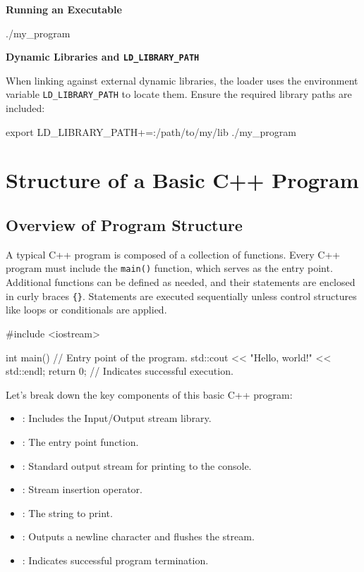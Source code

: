 \textbf{Running an Executable}

\begin{codeblock}[language=bash, numbers=none]
./my_program
\end{codeblock}

\textbf{Dynamic Libraries and \texttt{LD\_LIBRARY\_PATH}}

When linking against external dynamic libraries, the loader uses the environment variable \texttt{LD\_LIBRARY\_PATH} to locate them. Ensure the required library paths are included:

\begin{codeblock}[language=bash, numbers=none]
export LD_LIBRARY_PATH+=:/path/to/my/lib
./my_program
\end{codeblock}

\section{Structure of a Basic C++ Program}

\subsection{Overview of Program Structure}

A typical C++ program is composed of a collection of functions. Every C++ program must include the \texttt{main()} function, which serves as the entry point. Additional functions can be defined as needed, and their statements are enclosed in curly braces \texttt{\{\}}. Statements are executed sequentially unless control structures like loops or conditionals are applied.

\begin{exampleblock}
    \begin{codeblock}[language=C++]
#include <iostream>

int main() { // Entry point of the program.
    std::cout << "Hello, world!" << std::endl;
    return 0; // Indicates successful execution.
}
\end{codeblock}
\end{exampleblock}

Let's break down the key components of this basic C++ program:

\begin{itemize}
    \item {}: Includes the Input/Output stream library.
    \item {}: The entry point function.
    \item {}: Standard output stream for printing to the console.
    \item \plaintt{<<}: Stream insertion operator.
    \item {}: The string to print.
    \item {}: Outputs a newline character and flushes the stream.
    \item {}: Indicates successful program termination.
\end{itemize}

